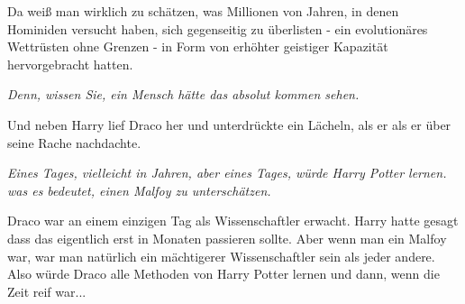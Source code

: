 Da weiß man wirklich zu schätzen, was Millionen von Jahren, in denen Hominiden
versucht haben, sich gegenseitig zu überlisten - ein evolutionäres Wettrüsten
ohne Grenzen - in Form von erhöhter geistiger Kapazität hervorgebracht hatten.

\emph{Denn, wissen Sie, ein Mensch hätte das absolut kommen sehen.}

Und neben Harry lief Draco her und unterdrückte ein Lächeln, als er als er über
seine Rache nachdachte.

\emph{Eines Tages, vielleicht in Jahren, aber eines Tages, würde Harry Potter
lernen. was es bedeutet, einen Malfoy zu unterschätzen.}

Draco war an einem einzigen Tag als Wissenschaftler erwacht. Harry hatte gesagt
dass das eigentlich erst in Monaten passieren sollte. Aber wenn man ein Malfoy
war, war man natürlich ein mächtigerer Wissenschaftler sein als jeder andere.
Also würde Draco alle Methoden von Harry Potter lernen und dann, wenn die Zeit
reif war...

